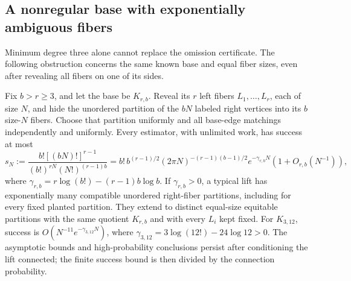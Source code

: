\subsection{A nonregular base with exponentially ambiguous fibers}
\label{sec:nonregular-obstruction}
Minimum degree three alone cannot replace the omission certificate.
The following obstruction concerns the same known base and equal fiber
sizes, even after revealing all fibers on one of its sides.

\begin{theorem}
\label{thm:nonregular-obstruction}
Fix $b>r\ge3$, and let the base be $K_{r,b}$. Reveal its $r$ left
fibers $L_1,\ldots,L_r$, each of size $N$, and hide the unordered
partition of the $bN$ labeled right vertices into its $b$ size-$N$
fibers. Choose that partition uniformly and all base-edge matchings
independently and uniformly. Every estimator, with unlimited work,
has success at most
\begin{equation}\label{eq:nonregular-success}
 s_N:=\frac{b![(bN)!]^{r-1}}
 {(b!)^{rN}(N!)^{(r-1)b}}
 =b!\,b^{(r-1)/2}(2\pi N)^{-(r-1)(b-1)/2}
       e^{-\gamma_{r,b}N}(1+O_{r,b}(N^{-1})),
\end{equation}
where $\gamma_{r,b}=r\log(b!)-(r-1)b\log b$.
If $\gamma_{r,b}>0$, a typical lift has exponentially many compatible
unordered right-fiber partitions, including for every fixed planted
partition. They extend to distinct equal-size equitable partitions
with the same quotient $K_{r,b}$ and with every $L_i$ kept fixed.
For $K_{3,12}$, success is $O(N^{-11}e^{-\gamma_{3,12}N})$, where
$\gamma_{3,12}=3\log(12!)-24\log12>0$.
The asymptotic bounds and high-probability conclusions persist after
conditioning the lift connected; the finite success bound is then
divided by the connection probability.
\end{theorem}

